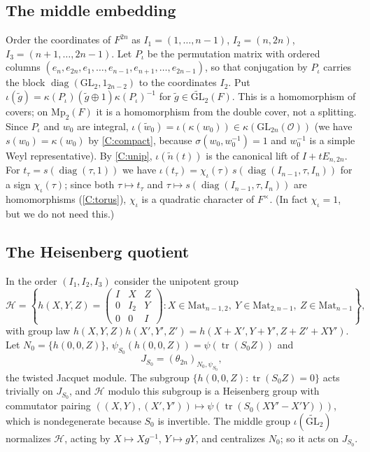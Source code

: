 \documentclass[11pt,oneside,notitlepage]{book}
\numberwithin{equation}{section}
\theoremstyle{plain}
\theoremstyle{definition}
\newcommand{\cO}{\mathcal{O}}
\newcommand{\GL}{\mathrm{GL}}
\newcommand{\Mp}{\mathrm{Mp}}
\newcommand{\Mat}{\mathrm{Mat}}
\newcommand{\tGL}{\widetilde{\GL}}
\newcommand{\tr}{\operatorname{tr}}
\newcommand{\diag}{\operatorname{diag}}
\begin{document}
\subsection*{The middle embedding}
Order the coordinates of $F^{2n}$ as $I_1=(1,\dots,n-1)$, $I_2=(n,2n)$, $I_3=(n+1,\dots,2n-1)$. Let $P_\iota$ be the permutation matrix with ordered columns $(e_n,e_{2n},e_1,\dots,e_{n-1},e_{n+1},\dots,e_{2n-1})$, so that conjugation by $P_\iota$ carries the block $\diag(\GL_2,1_{2n-2})$ to the coordinates $I_2$. Put $\iota(\tilde g)=\kappa(P_\iota)(\tilde g\oplus1)\kappa(P_\iota)^{-1}$ for $\tilde g\in\tGL_2(F)$. This is a homomorphism of covers; on $\Mp_2(F)$ it is a homomorphism from the double cover, not a splitting. Since $P_\iota$ and $w_0$ are integral, $\iota(\tilde w_0)=\iota(\kappa(w_0))\in\kappa(\GL_{2n}(\cO))$ (we have $s(w_0)=\kappa(w_0)$ by \ref{C:compact}, because $\sigma(w_0,w_0^{-1})=1$ and $w_0^{-1}$ is a simple Weyl representative). By \ref{C:unip}, $\iota(\tilde n(t))$ is the canonical lift of $I+tE_{n,2n}$. For $t_\tau =s(\diag(\tau ,1))$ we have $\iota(t_\tau )=\chi_\iota(\tau )\,s(\diag(I_{n-1},\tau ,I_n))$ for a sign $\chi_\iota(\tau )$; since both $\tau \mapsto t_\tau $ and $\tau \mapsto s(\diag(I_{n-1},\tau ,I_n))$ are homomorphisms (\ref{C:torus}), $\chi_\iota$ is a quadratic character of $F^\times$. (In fact $\chi_\iota=1$, but we do not need this.)

\subsection*{The Heisenberg quotient}
In the order $(I_1,I_2,I_3)$ consider the unipotent group
\[\mathcal H=\left\{h(X,Y,Z)=\begin{pmatrix}I&X&Z\\0&I_2&Y\\0&0&I\end{pmatrix}:X\in\Mat_{n-1,2},\ Y\in\Mat_{2,n-1},\ Z\in\Mat_{n-1}\right\},\]
with group law $h(X,Y,Z)h(X',Y',Z')=h(X+X',Y+Y',Z+Z'+XY')$. Let $N_0=\{h(0,0,Z)\}$, $\psi_{S_0}(h(0,0,Z))=\psi(\tr(S_0Z))$ and
\[J_{S_0}=(\theta_{2n})_{N_0,\psi_{S_0}},\]
the twisted Jacquet module. The subgroup $\{h(0,0,Z):\tr(S_0Z)=0\}$ acts trivially on $J_{S_0}$, and $\mathcal H$ modulo this subgroup is a Heisenberg group with commutator pairing $((X,Y),(X',Y'))\mapsto\psi(\tr(S_0(XY'-X'Y)))$, which is nondegenerate because $S_0$ is invertible. The middle group $\iota(\tGL_2)$ normalizes $\mathcal H$, acting by $X\mapsto Xg^{-1}$, $Y\mapsto gY$, and centralizes $N_0$; so it acts on $J_{S_0}$.
\end{document}
